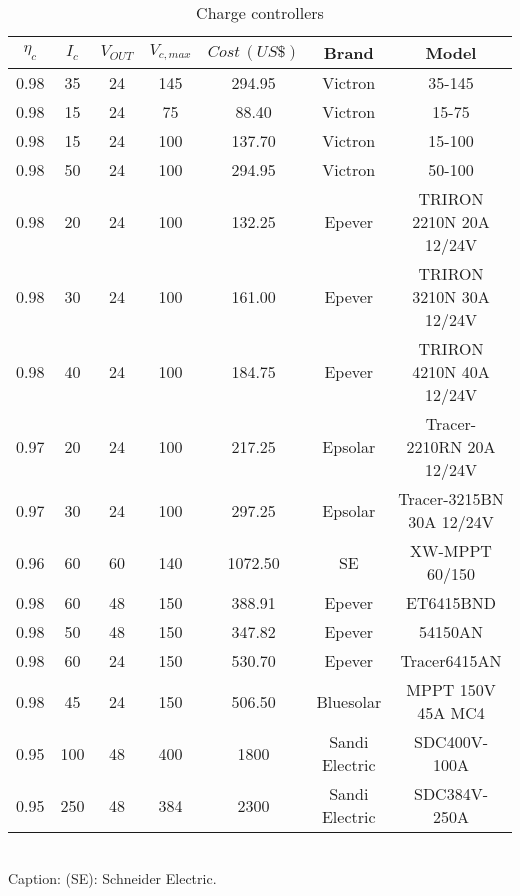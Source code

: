 \documentclass[journal,onecolumn]{IEEEtran}
\begin{document}

\begin{table}[h]
\renewcommand{\arraystretch}{1.3}
\caption{Charge controllers}\label{tab:charg}
\centering
\begin{scriptsize}
\begin{tabular}{c|c|c|c|c|c|c}
\hline
\hline
$\eta_{c}$ & $I_{c}$  & $V_{OUT}$ & $V_{c,max}$ & $Cost \, (US\$)$ & Brand & Model\\
\hline
\hline
0.98 & 35 & 24 & 145 & 294.95 & Victron & 35-145 \\
\hline
0.98 & 15 & 24 & 75 & 88.40 & Victron & 15-75 \\
\hline
0.98 & 15 & 24 & 100 & 137.70 & Victron & 15-100 \\
\hline
0.98 & 50 & 24 & 100 & 294.95 & Victron & 50-100 \\
\hline
0.98 & 20 & 24 & 100 & 132.25 & Epever & TRIRON 2210N 20A 12/24V \\
\hline
0.98 & 30 & 24 & 100 & 161.00 & Epever & TRIRON 3210N 30A 12/24V \\
\hline
0.98 & 40 & 24 & 100 & 184.75 & Epever & TRIRON 4210N 40A 12/24V \\
\hline
0.97 & 20 & 24 & 100 & 217.25 & Epsolar & Tracer-2210RN 20A 12/24V \\
\hline
0.97 & 30 & 24 & 100 & 297.25 & Epsolar & Tracer-3215BN 30A 12/24V \\
\hline
0.96 & 60 & 60 & 140 & 1072.50 & SE & XW-MPPT 60/150 \\
\hline
0.98 & 60 & 48 & 150 & 388.91 & Epever & ET6415BND \\
\hline
0.98 & 50 & 48 & 150 & 347.82 & Epever & 54150AN \\
\hline
0.98 & 60 & 24 & 150 & 530.70 & Epever & Tracer6415AN \\
\hline
0.98 & 45 & 24 & 150 & 506.50 & Bluesolar & MPPT 150V 45A MC4 \\
\hline
0.95 & 100 & 48 & 400 & 1800 & Sandi Electric & SDC400V-100A \\
\hline
0.95 & 250 & 48 & 384 & 2300 & Sandi Electric & SDC384V-250A \\
\hline
\hline
\end{tabular}
\newline
\\Caption: (SE): Schneider Electric.
\end{scriptsize}
\end{table}
\end{document}
